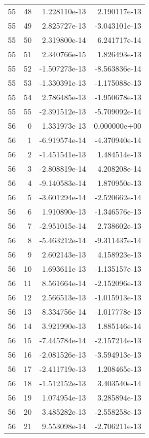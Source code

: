 \begin{tabular}{rrrr}
  55 &   48 &  1.228110e-13 &  2.190117e-13 \\
  55 &   49 &  2.825727e-13 & -3.043101e-13 \\
  55 &   50 &  2.319800e-14 &  6.241717e-14 \\
  55 &   51 &  2.340766e-15 &  1.826493e-13 \\
  55 &   52 & -1.507273e-13 & -8.563836e-14 \\
  55 &   53 & -1.330391e-13 & -1.175088e-13 \\
  55 &   54 &  2.786485e-13 & -1.950678e-13 \\
  55 &   55 & -2.391512e-13 & -5.709092e-14 \\
  56 &    0 &  1.331973e-13 &  0.000000e+00 \\
  56 &    1 & -6.919574e-14 & -4.370940e-14 \\
  56 &    2 & -1.451541e-13 &  1.484514e-13 \\
  56 &    3 & -2.808819e-14 &  4.208208e-14 \\
  56 &    4 & -9.140583e-14 &  1.870950e-13 \\
  56 &    5 & -3.601294e-14 & -2.520662e-14 \\
  56 &    6 &  1.910890e-13 & -1.346576e-13 \\
  56 &    7 & -2.951015e-14 &  2.738602e-13 \\
  56 &    8 & -5.463212e-14 & -9.311437e-14 \\
  56 &    9 &  2.602143e-13 &  4.158923e-13 \\
  56 &   10 &  1.693611e-13 & -1.135157e-13 \\
  56 &   11 &  8.561664e-14 & -2.152096e-13 \\
  56 &   12 &  2.566513e-13 & -1.015913e-13 \\
  56 &   13 & -8.334756e-14 & -1.017778e-13 \\
  56 &   14 &  3.921990e-13 &  1.885146e-14 \\
  56 &   15 & -7.445784e-14 & -2.157214e-13 \\
  56 &   16 & -2.081526e-13 & -3.594913e-13 \\
  56 &   17 & -2.411719e-13 &  1.208465e-13 \\
  56 &   18 & -1.512152e-13 &  3.403540e-14 \\
  56 &   19 &  1.074954e-13 &  3.285894e-13 \\
  56 &   20 &  3.485282e-13 & -2.558258e-13 \\
  56 &   21 &  9.553098e-14 & -2.706211e-13 \\

\end{tabular}
